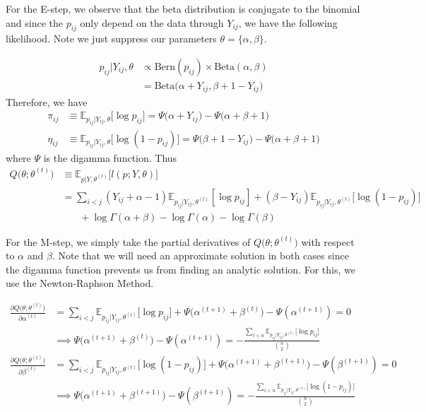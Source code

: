 \documentclass{article}
\begin{document}
For the E-step, we observe that the beta distribution is conjugate to the binomial and since the $p_{ij}$ only depend on the data through $Y_{ij}$, we have the following likelihood. Note we just suppress our parameters $\theta = \{\alpha, \beta\}$.

\begin{align*}
p_{ij} | Y_{ij}, \theta &\propto \text{Bern}(p_{ij})\times \text{Beta}(\alpha, \beta)\\
&= \text{Beta}\Big(\alpha + Y_{ij}, \beta + 1 - Y_{ij}\Big)
\end{align*}
Therefore, we have
\begin{align*}
\pi_{ij} &\equiv \mathbb{E}_{p_{ij} | Y_{ij}, \theta} \big[\log p_{ij}\big] = \Psi\Big(\alpha + Y_{ij}\Big) - \Psi\Big(\alpha + \beta + 1\Big) \\
\eta_{ij} &\equiv \mathbb{E}_{p_{ij} | Y_{ij}, \theta} \big[\log (1 - p_{ij})\big] = \Psi\Big(\beta + 1 - Y_{ij}\Big) - \Psi\Big(\alpha + \beta + 1\Big)
\end{align*}
where $\Psi$ is the digamma function. Thus
\begin{align*}
Q\big(\theta; \theta^{(t)}\big) &\equiv \mathbb{E}_{p | Y, \theta^{(t)}} \Big[l(p; Y, \theta)\Big] \\
&= \sum_{i<j} (Y_{ij} + \alpha - 1) \mathbb{E}_{p_{ij} | Y_{ij}, \theta^{(t)}} [\log  p_{ij}] + (\beta -Y_{ij}) \mathbb{E}_{p_{ij} | Y_{ij}, \theta^{(t)}} \big[\log (1-p_{ij})\big] \\
&\ \ \ \ \ \ \ \ + \log \Gamma(\alpha + \beta) - \log \Gamma(\alpha) - \log \Gamma(\beta) \tag{E}
\end{align*}



For the M-step, we simply take the partial derivatives of $Q\big(\theta; \theta^{(t)}\big)$ with respect to $\alpha$ and $\beta$. Note that we will need an approximate solution in both cases since the digamma function prevents us from finding an analytic solution. For this, we use the Newton-Raphson Method.

\begin{align*}
\frac{\partial Q\big(\theta; \theta^{(t)}\big)}{\partial \alpha^{(t)}} &= \sum_{i<j} \mathbb{E}_{p_{ij} | Y_{ij}, \theta^{(t)}} \big[\log p_{ij}\big] + \Psi\Big(\alpha^{(t+1)} + \beta^{(t)}\Big) - \Psi(\alpha^{(t+1)})= 0 \\
&\implies \Psi\Big(\alpha^{(t+1)} + \beta^{(t)}\Big) - \Psi(\alpha^{(t+1)}) = -\frac{\sum_{i<n}\mathbb{E}_{p_{ij} | Y_{ij}, \theta^{(t)}} \big[\log p_{ij}\big]}{{n \choose 2}} \tag{MU1} \\
\frac{\partial Q\big(\theta; \theta^{(t)}\big)}{\partial \beta^{(t)}} &= \sum_{i<j} \mathbb{E}_{p_{ij} | Y_{ij}, \theta^{(t)}} \big[\log (1- p_{ij})\big] + \Psi\Big(\alpha^{(t+1)} + \beta^{(t+1)}\Big) - \Psi(\beta^{(t+1)}) = 0 \\
&\implies \Psi\Big(\alpha^{(t+1)} + \beta^{(t+1)}\Big) - \Psi(\beta^{(t+1)}) = -\frac{\sum_{i<n}\mathbb{E}_{p_{ij} | Y_{ij}, \theta^{(t)}} \big[\log (1 - p_{ij})\big]}{{n \choose 2}} \tag{MU2} \\
\end{align*}
\end{document}
